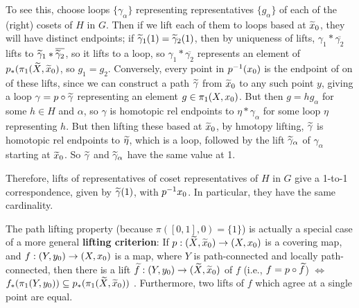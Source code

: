 To see this, choose loops $\{\gamma_\alpha\}$ representing representatives $\{g_\alpha\}$ of each of the (right) cosets of $H$ in $G$. Then if we lift
each of them to loops based at $\widetilde{x}_0$, they will have distinct
endpoints; if $\widetilde{\gamma}_1(1)=\widetilde{\gamma}_2(1)$, then 
by uniqueness of lifts, $\gamma_1*\overline{\gamma_2}$ lifts to 
$\widetilde{\gamma}_1*\overline{\widetilde{\gamma}_2}$, so it
lifts to a loop, so $\gamma_1*\overline{\gamma_2}$ represents
an element of $p_*(\pi_1(\widetilde{X},\widetilde{x}_0)$, so $g_1=g_2$.
Conversely, every point in $p^{-1}(x_0)$ is the endpoint of on of these
lifts, since we can construct a path $\widetilde{\gamma}$
from $\widetilde{x}_0$ to any such point $y$, giving a loop
$\gamma=p\circ \widetilde{\gamma}$ representing an element $g\in\pi_1(X,x_0)$.
But then $g=hg_\alpha$ for some $h\in H$ and $\alpha$, 
so $\gamma$ is homotopic rel endpoints to $\eta*\gamma_\alpha$ for some loop
$\eta$ representing $h$. But then lifting these based at $\widetilde{x}_0$, by hmotopy
lifting, $\widetilde{\gamma}$ is homotopic rel endpoints to $\widetilde{\eta}$, which is a 
loop, followed by the lift $\widetilde{\gamma}_\alpha$ of $\gamma_\alpha$
starting at $\widetilde{x}_0$. So $\widetilde{\gamma}$ and 
$\widetilde{\gamma}_\alpha$ have the same value at 1.

\ssk

Therefore, lifts of representatives of coset representatives of $H$ in $G$ give
a 1-to-1 correspondence, given by $\widetilde{\gamma}(1)$, with $p^{-1}{x_0}$.
In particular, they have the same cardinality.

\msk

The path lifting property (because $\pi([0,1],0)=\{1\}$) is actually a special
case of a more general {\bf lifting criterion}: If 
$p:(\widetilde{X},\widetilde{x}_0)\rightarrow (X,x_0)$ is a covering map, and 
$f:(Y,y_0)\rightarrow (X,x_0)$ is a map, where
$Y$ is path-connected and locally path-connected, then there is a lift 
$\widetilde{f}:(Y,y_0)\rightarrow (\widetilde{X},\widetilde{x}_0)$ of $f$ (i.e., 
$f=p\circ\widetilde{f}$) $\Leftrightarrow$ 
$f_*(\pi_1(Y,y_0))\subseteq p_*(\pi_1(\widetilde{X},\widetilde{x}_0))$ . 
Furthermore, two lifts of $f$ which agree at a single point are equal.

\msk

